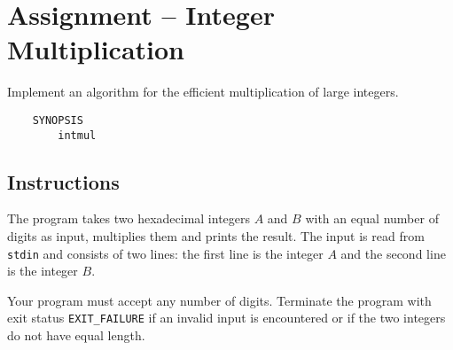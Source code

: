 
\usepackage{amsmath}
\usepackage{multicol}
\usepackage{graphicx}



\section*{Assignment -- Integer Multiplication}
Implement an algorithm for the efficient multiplication of large integers.
\begin{verbatim}
    SYNOPSIS
        intmul
\end{verbatim}

\subsection*{Instructions}
The program takes two hexadecimal integers $A$ and $B$ with an equal number of digits as input, multiplies them and prints the result.
The input is read from \texttt{stdin} and consists of two lines:
the first line is the integer $A$ and the second line is the integer $B$.

Your program must accept any number of digits.
Terminate the program with exit status \verb|EXIT_FAILURE|
if an invalid input is encountered
or if the two integers do not have equal length.

